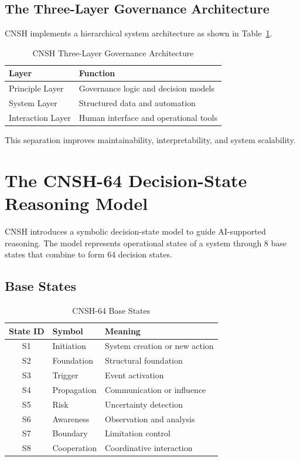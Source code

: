 \documentclass[conference]{IEEEtran}
\begin{document}
\subsection{The Three-Layer Governance Architecture}

CNSH implements a hierarchical system architecture as shown in
Table~\ref{tab:threelayer}.

\begin{table}[t]
\centering
\caption{CNSH Three-Layer Governance Architecture}
\label{tab:threelayer}
\renewcommand{\arraystretch}{1.3}
\begin{tabular}{ll}
\toprule
\textbf{Layer} & \textbf{Function} \\
\midrule
Principle Layer & Governance logic and decision models \\
System Layer & Structured data and automation \\
Interaction Layer & Human interface and operational tools \\
\bottomrule
\end{tabular}
\end{table}

This separation improves maintainability, interpretability,
and system scalability.

\section{The CNSH-64 Decision-State Reasoning Model}

CNSH introduces a symbolic decision-state model to guide
AI-supported reasoning. The model represents operational states
of a system through 8 base states that combine to form
64 decision states.

\subsection{Base States}

\begin{table}[t]
\centering
\caption{CNSH-64 Base States}
\label{tab:basestates}
\renewcommand{\arraystretch}{1.2}
\begin{tabular}{cll}
\toprule
\textbf{State ID} & \textbf{Symbol} & \textbf{Meaning} \\
\midrule
S1 & Initiation & System creation or new action \\
S2 & Foundation & Structural foundation \\
S3 & Trigger & Event activation \\
S4 & Propagation & Communication or influence \\
S5 & Risk & Uncertainty detection \\
S6 & Awareness & Observation and analysis \\
S7 & Boundary & Limitation control \\
S8 & Cooperation & Coordinative interaction \\
\bottomrule
\end{tabular}
\end{table}
\end{document}
